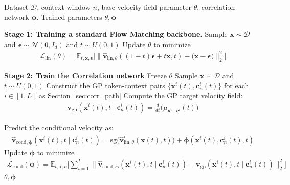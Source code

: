 \documentclass{article} %
\begin{document}
\begin{algorithm}[t]
\caption{Two-stage training of Correlation-aware Flow}
\label{alg:training}
\begin{algorithmic}[1]
\Require Dataset $\mathcal{D}$, context window $n$, base velocity field parameter $\theta$, correlation network $\boldsymbol{\phi}$.
\Ensure Trained parameters $\theta, \boldsymbol{\phi}$

\Statex \textbf{Stage 1: Training a standard Flow Matching backbone.}
    \State Sample $\mathbf{x} \sim \mathcal{D}$ and $\boldsymbol{\epsilon} \sim \mathcal{N}(0,I_d)$ and $t \sim U(0,1)$ 
    \State Update $\theta$ to minimize 
    \begin{eqnarray}
        \mathcal{L}_{\text{lin}}(\theta) = \mathbb{E}_{t, \mathbf{x}, \boldsymbol{\epsilon}} \Big[\big\|\hat{\mathbf{v}}_{\text{lin}, \theta}( (1-t) \boldsymbol{\epsilon} + t \mathbf{x}, t) - \big(  \mathbf{x} - \boldsymbol{\epsilon}\big)\big\|^2_2 \Big]\nonumber
    \end{eqnarray}   
\EndFor

\Statex \textbf{Stage 2: Train the Correlation network}
\State Freeze $\theta$
    \State Sample $\mathbf{x} \sim \mathcal{D}$ and $t \sim U(0,1)$
    \State Construct the GP token-context pairs $\{\mathbf{x}^{i}(t), \mathbf{c}_n^{i}(t)\}$ for each $i \in [1, L]$ as Section~\ref{sec:corr_path} 
    \State Compute the GP target velocity field:
    \begin{eqnarray}
        \mathbf{v}_{\text{gp}}(\mathbf{x}^i(t),t \mid \mathbf{c}_n^{i}(t))           = \frac{d}{dt} \big(\mu_{\mathbf{x}^i\mid \mathbf{c}^i}(t) \big)                                        \nonumber
    \end{eqnarray}
   
    \State Predict the conditional velocity as:
    \begin{eqnarray}
    \hat{\mathbf{v}}_{\text{cond}, \boldsymbol{\phi}} (\mathbf{x}^i(t),t  \mid \mathbf{c}_n^{i}(t)) = \text{sg}\Big(\hat{\mathbf{v}}^{i}_{\text{lin},\theta} (\mathbf{x}(t), t) \Big) + \boldsymbol{\phi}(\mathbf{x}^i(t), \mathbf{c}_n^i(t) ,t) \nonumber 
    \end{eqnarray}
    \State Update $\boldsymbol{\phi}$ to minimize 
    \begin{eqnarray}
    \mathcal{L}_{\text{cond}}(\boldsymbol{\phi}) =\mathbb{E}_{t, \mathbf{x}, \mathbf{c}} \Big[\sum_{i=1}^{L} \| \hat{\mathbf{v}}_{\text{cond}, \boldsymbol{\phi}} (\mathbf{x}^i(t),t  \mid \mathbf{c}_n^{i}(t)) - \mathbf{v}_{\mathrm{gp}}(\mathbf{x}^i(t), t \mid \mathbf{c}_n^i(t))\|^2_2\Big] \nonumber
\end{eqnarray}
\EndFor
\State \Return $\theta,\boldsymbol{\phi}$
\end{algorithmic}
\end{algorithm}
\end{document}
